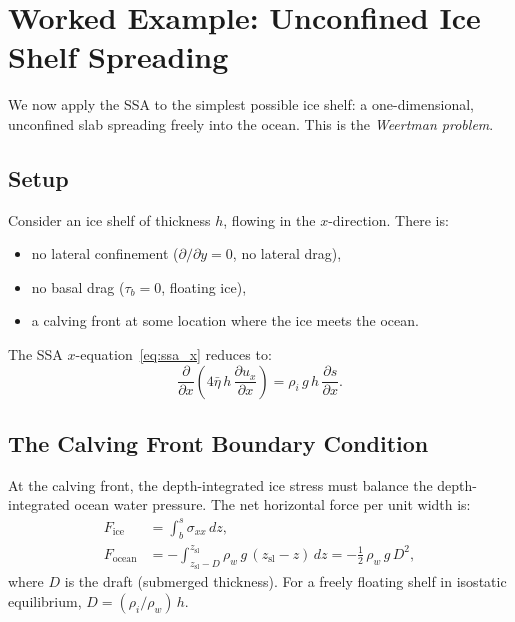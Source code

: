 \documentclass[11pt]{article}
\begin{document}
\section{Worked Example: Unconfined Ice Shelf Spreading}

We now apply the SSA to the simplest possible ice shelf: a one-dimensional, unconfined slab spreading freely into the ocean.  This is the \textit{Weertman problem}.

\subsection{Setup}

Consider an ice shelf of thickness $h$, flowing in the $x$-direction.  There is:
\begin{itemize}[nosep]
  \item no lateral confinement ($\partial/\partial y = 0$, no lateral drag),
  \item no basal drag ($\tau_b = 0$, floating ice),
  \item a calving front at some location where the ice meets the ocean.
\end{itemize}

\noindent The SSA $x$-equation~\eqref{eq:ssa_x} reduces to:
\begin{equation}
  \frac{\partial}{\partial x}\!\left(4\bar{\eta}\,h\,\frac{\partial u_x}{\partial x}\right) = \rho_i\,g\,h\,\frac{\partial s}{\partial x}.
  \label{eq:shelf_1d}
\end{equation}


\subsection{The Calving Front Boundary Condition}

At the calving front, the depth-integrated ice stress must balance the depth-integrated ocean water pressure.  The net horizontal force per unit width is:
\begin{align}
  F_{\text{ice}} &= \int_b^s \sigma_{xx}\,dz, \\[4pt]
  F_{\text{ocean}} &= -\int_{z_{\text{sl}}-D}^{z_{\text{sl}}} \rho_w\,g\,(z_{\text{sl}} - z)\,dz = -\frac{1}{2}\,\rho_w\,g\,D^2,
\end{align}
where $D$ is the draft (submerged thickness).  For a freely floating shelf in isostatic equilibrium, $D = (\rho_i/\rho_w)\,h$.
\end{document}
